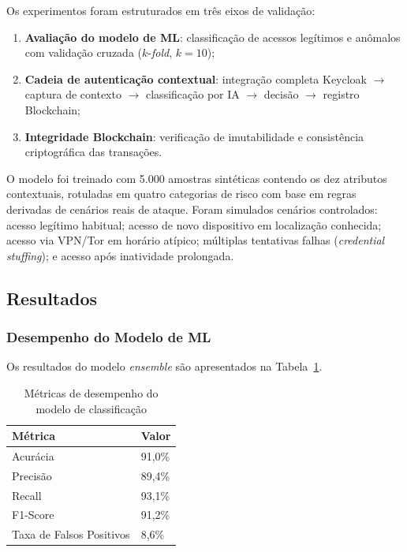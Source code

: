 \documentclass[12pt]{article}
\begin{document}
Os experimentos foram estruturados em três eixos de validação:

\begin{enumerate}[leftmargin=*]
    \item \textbf{Avaliação do modelo de ML}: classificação de acessos legítimos e anômalos com validação cruzada ($k$-\textit{fold}, $k=10$);
    \item \textbf{Cadeia de autenticação contextual}: integração completa Keycloak $\rightarrow$ captura de contexto $\rightarrow$ classificação por IA $\rightarrow$ decisão $\rightarrow$ registro Blockchain;
    \item \textbf{Integridade Blockchain}: verificação de imutabilidade e consistência criptográfica das transações.
\end{enumerate}

O modelo foi treinado com 5.000 amostras sintéticas contendo os dez atributos contextuais, rotuladas em quatro categorias de risco com base em regras derivadas de cenários reais de ataque. Foram simulados cenários controlados: acesso legítimo habitual; acesso de novo dispositivo em localização conhecida; acesso via VPN/Tor em horário atípico; múltiplas tentativas falhas (\textit{credential stuffing}); e acesso após inatividade prolongada.

\subsection{Resultados}

\subsubsection{Desempenho do Modelo de ML}

Os resultados do modelo \textit{ensemble} são apresentados na Tabela~\ref{tab:ml_results}.

\begin{table}[H]
\centering
\caption{Métricas de desempenho do modelo de classificação}
\label{tab:ml_results}
\small
\begin{tabular}{@{}ll@{}}
\toprule
\textbf{Métrica} & \textbf{Valor} \\
\midrule
Acurácia            & 91,0\% \\
Precisão            & 89,4\% \\
Recall              & 93,1\% \\
F1-Score            & 91,2\% \\
Taxa de Falsos Positivos & 8,6\% \\
\bottomrule
\end{tabular}
\end{table}
\end{document}
